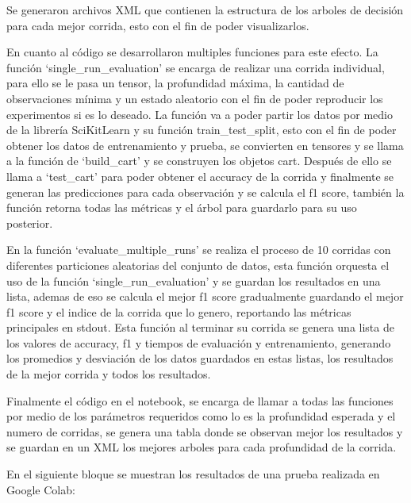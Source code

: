 \documentclass[12pt,a4paper]{article}
\begin{document}
Se generaron archivos XML que contienen la estructura de los arboles de decisión para cada mejor corrida, esto con el fin de poder visualizarlos.

En cuanto al código se desarrollaron multiples funciones para este efecto.
La función `single_run_evaluation' se encarga de realizar una corrida individual,
para ello se le pasa un tensor, la profundidad máxima, la cantidad de observaciones mínima y un estado aleatorio con el fin de
poder reproducir los experimentos si es lo deseado.
La función va a poder partir los datos por medio de la librería SciKitLearn y su función
train_test_split, esto con el fin de poder obtener los datos de entrenamiento y prueba, se convierten en tensores y se
llama a la función de `build_cart' y se construyen los objetos cart.
Después de ello se llama a `test_cart' para poder obtener el accuracy de la corrida y finalmente se generan
las predicciones para cada observación y se calcula el f1 score, también la función retorna todas las métricas y el árbol para guardarlo
para su uso posterior.

En la función `evaluate_multiple_runs' se realiza el proceso de 10 corridas con diferentes particiones aleatorias del conjunto de datos,
esta función orquesta el uso de la función `single_run_evaluation' y se guardan los resultados en una lista, ademas de eso se calcula el mejor f1 score
gradualmente guardando el mejor f1 score y el indice de la corrida que lo genero, reportando las métricas principales en stdout.
Esta función al terminar su corrida se genera una lista de los valores de accuracy, f1 y tiempos de evaluación y entrenamiento, generando los promedios y desviación de los
datos guardados en estas listas, los resultados de la mejor corrida y todos los resultados.

Finalmente el código en el notebook, se encarga de llamar a todas las funciones por medio de los parámetros requeridos como lo es
la profundidad esperada y el numero de corridas, se genera una tabla donde se observan mejor los resultados y se guardan en un XML
los mejores arboles para cada profundidad de la corrida.

En el siguiente bloque se muestran los resultados de una prueba realizada en Google Colab:
\end{document}
